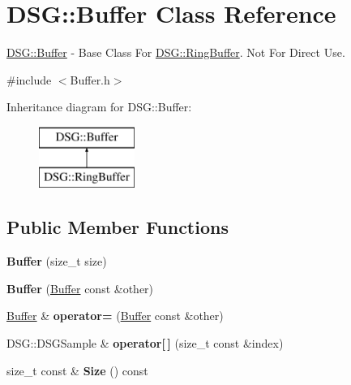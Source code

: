 \hypertarget{class_d_s_g_1_1_buffer}{\section{D\+S\+G\+:\+:Buffer Class Reference}
\label{class_d_s_g_1_1_buffer}
}


\hyperlink{class_d_s_g_1_1_buffer}{D\+S\+G\+::\+Buffer} -\/ Base Class For \hyperlink{class_d_s_g_1_1_ring_buffer}{D\+S\+G\+::\+Ring\+Buffer}. Not For Direct Use.  




{\ttfamily \#include $<$Buffer.\+h$>$}

Inheritance diagram for D\+S\+G\+:\+:Buffer\+:\begin{figure}[H]
\begin{center}
\leavevmode
\includegraphics[height=2.000000cm]{class_d_s_g_1_1_buffer}
\end{center}
\end{figure}
\subsection*{Public Member Functions}
\begin{DoxyCompactItemize}
\item 
\hypertarget{class_d_s_g_1_1_buffer_a0e6502fd61833043744f9df94e8d5111}{{\bfseries Buffer} (size\+\_\+t size)}\label{class_d_s_g_1_1_buffer_a0e6502fd61833043744f9df94e8d5111}

\item 
\hypertarget{class_d_s_g_1_1_buffer_a468a65d70553dfb773e4592b4b077683}{{\bfseries Buffer} (\hyperlink{class_d_s_g_1_1_buffer}{Buffer} const \&other)}\label{class_d_s_g_1_1_buffer_a468a65d70553dfb773e4592b4b077683}

\item 
\hypertarget{class_d_s_g_1_1_buffer_a977d572a7d402ff6bf991d7c5c0cc6a7}{\hyperlink{class_d_s_g_1_1_buffer}{Buffer} \& {\bfseries operator=} (\hyperlink{class_d_s_g_1_1_buffer}{Buffer} const \&other)}\label{class_d_s_g_1_1_buffer_a977d572a7d402ff6bf991d7c5c0cc6a7}

\item 
\hypertarget{class_d_s_g_1_1_buffer_a5358d81096cd0801e4fce7851809b3ef}{D\+S\+G\+::\+D\+S\+G\+Sample \& {\bfseries operator\mbox{[}$\,$\mbox{]}} (size\+\_\+t const \&index)}\label{class_d_s_g_1_1_buffer_a5358d81096cd0801e4fce7851809b3ef}

\item 
\hypertarget{class_d_s_g_1_1_buffer_a4acea659d9cd0be652ec55d21e5b0262}{size\+\_\+t const \& {\bfseries Size} () const }\label{class_d_s_g_1_1_buffer_a4acea659d9cd0be652ec55d21e5b0262}

\end{DoxyCompactItemize}

